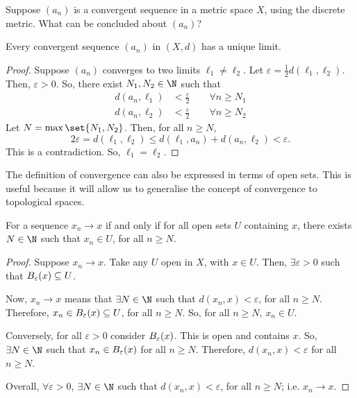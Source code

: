 \begin{nex}
  Suppose $(a_n)$ is a convergent sequence in a metric space $X$, using the discrete metric. What can be concluded about $(a_n)$?
\end{nex}

\begin{nlemma}
  Every convergent sequence $(a_n)$ in $(X,d)$ has a unique limit.
\end{nlemma}
\begin{proof}
  Suppose $(a_n)$ converges to two limits $\ell_1 \neq \ell_2$. Let $\varepsilon = \frac{1}{2} d(\ell_1,\ell_2)$. Then, $\varepsilon > 0$. So, there exist $N_1, N_2 \in \N$ such that
  \begin{align*}
    d(a_n, \ell_1) &< \frac{\varepsilon}{2} \qquad\forall n \geq N_1\\
    d(a_n, \ell_2) &< \frac{\varepsilon}{2} \qquad\forall n \geq N_2
  \end{align*}
  Let $N = \max\set{N_1, N_2}$. Then, for all $n \geq N$,
  \begin{equation*}
    2\varepsilon = d(\ell_1, \ell_2)
    \leq d(\ell_1, a_n) + d(a_n, \ell_2) < \varepsilon.
  \end{equation*}
  This is a contradiction. So, $\ell_1 = \ell_2$.
\end{proof}

The definition of convergence can also be expressed in terms of open sets. This is useful because it will allow us to generalise the concept of convergence to topological spaces.
\begin{nlemma}
  For a sequence $x_n \to x$ if and only if for all open sets $U$ containing $x$, there exists $N \in \N$ such that $x_n \in U$, for all $n \geq N$.
\end{nlemma}
\begin{proof}
  Suppose $x_n \to x$. Take any $U$ open in $X$, with $x \in U$. Then, $\exists \varepsilon>0$ such that $B_{\varepsilon}(x) \subseteq U$.

  Now, $x_n \to x$ means that $\exists N \in \N$ such that $d(x_n, x) < \varepsilon$, for all $n \geq N$. Therefore, $x_n \in B_{\varepsilon}(x) \subseteq U$, for all $n \geq N$. So, for all $n \geq N$, $x_n \in U$.

  Conversely, for all $\varepsilon>0$ consider $B_{\varepsilon}(x)$. This is open and contains $x$. So, $\exists N \in \N$ such that $x_n \in B_{\varepsilon}(x)$ for all $n \geq N$. Therefore, $d(x_n, x) < \varepsilon$ for all $n \geq N$.

  Overall, $\forall \varepsilon>0$, $\exists N \in \N$ such that $d(x_n, x) < \varepsilon$, for all $n \geq N$; i.e. $x_n \to x$.
\end{proof}

